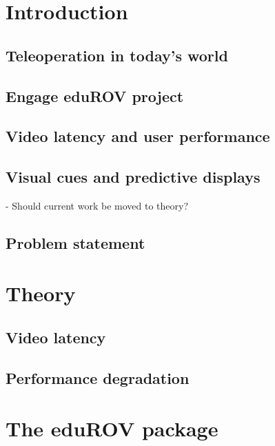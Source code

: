 \documentclass[b5paper,10pt,twoside]{book}
\begin{document}



{
\tableofcontents
}
{
\chapter{Introduction}
	\section{Teleoperation in today's world}
	\section{Engage eduROV project}
	\section{Video latency and user performance}
	\section{Visual cues and predictive displays}
	- Should current work be moved to theory?
	\section{Problem statement}
	
	
\chapter{Theory}
	\section{Video latency}
	\section{Performance degradation}
	
\chapter{The eduROV package}
}
\end{document}
